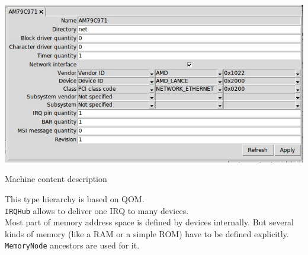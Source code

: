 \documentclass[unicode,hyperref={unicode=true},aspectratio=169]{beamer}
\begin{document}
\begin{frame}
\begin{center}
\includegraphics[height=0.9\textheight]{AM79C971.jpg}
\end{center}
\end{frame}



\begin{frame}[fragile]{Machine content description}

\begin{minipage}{0.61\textwidth}
\end{minipage}
\begin{minipage}{0.37\textwidth}
This type hierarchy is based on QOM. \\
\vfill
\texttt{IRQHub} allows to deliver one IRQ to many devices. \\
\vfill
Most part of memory address space is defined by devices internally.
But several kinds of memory (like a RAM or a simple ROM) have to be defined
explicitly.
\texttt{MemoryNode} ancestors are used for it. \\
\end{minipage}
\end{frame}
\end{document}
